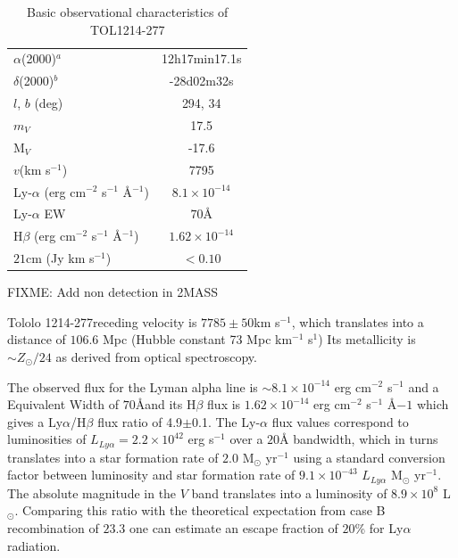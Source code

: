 \documentclass[a4paper, usenatbib, 12pt]{article}
\newcommand{\tol}{Tololo 1214-277}
\begin{document}
{\begin{table}
\begin{center}
\begin{tabular}{lc}
$\alpha$(2000)$^{a}$ & 12h17min17.1s\\
$\delta$(2000)$^{b}$ & -28d02m32s\\
$l$, $b$ (deg) & 294, 34\\
$m_V$ & 17.5\\
  M$_V$ & -17.6\\ 
$v$(km s$^{-1}$) & 7795\\
Ly-$\alpha$ (erg cm$^{-2}$ s$^{-1}$ \AA$^{-1}$)& $8.1\times 10^{-14}$ \\
Ly-$\alpha$ EW & $70$\AA\\
H$\beta$ (erg cm$^{-2}$ s$^{-1}$ \AA$^{-1}$) & $1.62\times 10^{-14}$ \\
$21$cm (Jy km s$^{-1}$)& $<0.10$ \\
\end{tabular}
\end{center}
\caption{Basic observational characteristics of TOL1214-277
  \cite{Thuan97}\\} 
\end{table}

FIXME: Add non detection in 2MASS %

\tol receding velocity is $7785\pm 50$km s$^{-1}$, which translates
into a distance of $106.6$ Mpc (Hubble constant 73 Mpc km$^{-1}$
s$^{1}$)
Its metallicity is $\sim Z_{\odot}/24$ \cite{Izotov04} as derived from optical
spectroscopy. 


The observed flux for the Lyman alpha line is $\sim
8.1\times 10^{-14}$ erg cm$^{-2}$ s$^{-1}$ \cite{Thuan97}
and a Equivalent Width of $70$\AA and its H$\beta$ flux is 
$1.62\times 10^{-14}$ erg cm$^{-2}$ s$^{-1}$ \AA${-1}$
\cite{Izotov04} which gives a Ly$\alpha$/H$\beta$ flux ratio of
4.9$\pm$0.1. The Ly-$\alpha$ flux values correspond to luminosities of
$L_{Ly\alpha}=2.2\times 10^{42}$ erg s$^{-1}$ over a $20$\AA
bandwidth, which in turns translates  into a star formation rate of
$2.0$ M$_{\odot}$ yr$^{-1}$ using a standard conversion factor between
luminosity and star formation rate of $9.1\times 10^{-43}$
$L_{Ly\alpha}$ M$_{\odot}$ yr$^{-1}$. 
The absolute magnitude in the $V$ band translates into a luminosity of
$8.9\times 10^{8}$ L$_{\odot}$.
Comparing this ratio with the theoretical expectation from case B
recombination of $23.3$ \cite{Hummer1987} one can estimate an escape
fraction of $20$\% for Ly$\alpha$ radiation.

}
\end{document}
